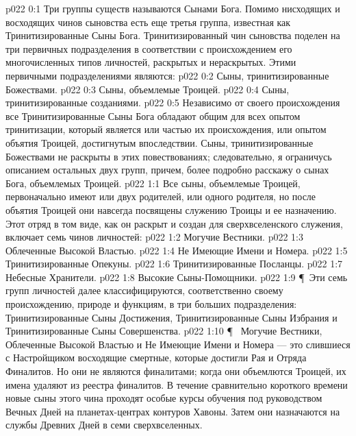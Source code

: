 \author{Могучий Вестник}
\vs p022 0:1 Три группы существ называются Сынами Бога. Помимо нисходящих и восходящих чинов сыновства есть еще третья группа, известная как Тринитизированные Сыны Бога. Тринитизированный чин сыновства поделен на три первичных подразделения в соответствии с происхождением его многочисленных типов личностей, раскрытых и нераскрытых. Этими первичными подразделениями являются:
\vs p022 0:2 \bibnobreakspace Сыны, тринитизированные Божествами.
\vs p022 0:3 \bibnobreakspace Сыны, объемлемые Троицей.
\vs p022 0:4 \bibnobreakspace Сыны, тринитизированные созданиями.
\vs p022 0:5 Независимо от своего происхождения все Тринитизированные Сыны Бога обладают общим для всех опытом тринитизации, который является или частью их происхождения, или опытом объятия Троицей, достигнутым впоследствии. Сыны, тринитизированные Божествами не раскрыты в этих повествованиях; следовательно, я ограничусь описанием остальных двух групп, причем, более подробно расскажу о сынах Бога, объемлемых Троицей.
\vs p022 1:1 Все сыны, объемлемые Троицей, первоначально имеют или двух родителей, или одного родителя, но после объятия Троицей они навсегда посвящены служению Троицы и ее назначению. Этот отряд в том виде, как он раскрыт и создан для сверхвселенского служения, включает семь чинов личностей:
\vs p022 1:2 \bibnobreakspace Могучие Вестники.
\vs p022 1:3 \bibnobreakspace Облеченные Высокой Властью.
\vs p022 1:4 \bibnobreakspace Не Имеющие Имени и Номера.
\vs p022 1:5 \bibnobreakspace Тринитизированные Опекуны.
\vs p022 1:6 \bibnobreakspace Тринитизированные Посланцы.
\vs p022 1:7 \bibnobreakspace Небесные Хранители.
\vs p022 1:8 \bibnobreakspace Высокие Сыны\hyp{}Помощники.
\vs p022 1:9 \P\ Эти семь групп личностей далее классифицируются, соответственно своему происхождению, природе и функциям, в три больших подразделения: Тринитизированные Сыны Достижения, Тринитизированные Сыны Избрания и Тринитизированные Сыны Совершенства.
\vs p022 1:10 \P\  Могучие Вестники, Облеченные Высокой Властью и Не Имеющие Имени и Номера --- это слившиеся с Настройщиком восходящие смертные, которые достигли Рая и Отряда Финалитов. Но они не являются финалитами; когда они объемлются Троицей, их имена удаляют из реестра финалитов. В течение сравнительно короткого времени новые сыны этого чина проходят особые курсы обучения под руководством Вечных Дней на планетах\hyp{}центрах контуров Хавоны. Затем они назначаются на службы Древних Дней в семи сверхвселенных.
